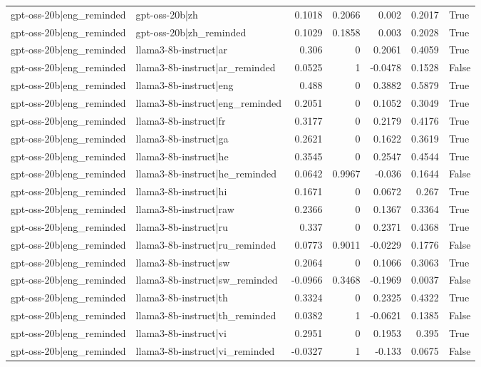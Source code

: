 \begin{table}
\begin{tabular}{l l r r r r l}
gpt-oss-20b|eng_reminded & gpt-oss-20b|zh & 0.1018 & 0.2066 & 0.002 & 0.2017 & True \\
gpt-oss-20b|eng_reminded & gpt-oss-20b|zh_reminded & 0.1029 & 0.1858 & 0.003 & 0.2028 & True \\
gpt-oss-20b|eng_reminded & llama3-8b-instruct|ar & 0.306 & 0 & 0.2061 & 0.4059 & True \\
gpt-oss-20b|eng_reminded & llama3-8b-instruct|ar_reminded & 0.0525 & 1 & -0.0478 & 0.1528 & False \\
gpt-oss-20b|eng_reminded & llama3-8b-instruct|eng & 0.488 & 0 & 0.3882 & 0.5879 & True \\
gpt-oss-20b|eng_reminded & llama3-8b-instruct|eng_reminded & 0.2051 & 0 & 0.1052 & 0.3049 & True \\
gpt-oss-20b|eng_reminded & llama3-8b-instruct|fr & 0.3177 & 0 & 0.2179 & 0.4176 & True \\
gpt-oss-20b|eng_reminded & llama3-8b-instruct|ga & 0.2621 & 0 & 0.1622 & 0.3619 & True \\
gpt-oss-20b|eng_reminded & llama3-8b-instruct|he & 0.3545 & 0 & 0.2547 & 0.4544 & True \\
gpt-oss-20b|eng_reminded & llama3-8b-instruct|he_reminded & 0.0642 & 0.9967 & -0.036 & 0.1644 & False \\
gpt-oss-20b|eng_reminded & llama3-8b-instruct|hi & 0.1671 & 0 & 0.0672 & 0.267 & True \\
gpt-oss-20b|eng_reminded & llama3-8b-instruct|raw & 0.2366 & 0 & 0.1367 & 0.3364 & True \\
gpt-oss-20b|eng_reminded & llama3-8b-instruct|ru & 0.337 & 0 & 0.2371 & 0.4368 & True \\
gpt-oss-20b|eng_reminded & llama3-8b-instruct|ru_reminded & 0.0773 & 0.9011 & -0.0229 & 0.1776 & False \\
gpt-oss-20b|eng_reminded & llama3-8b-instruct|sw & 0.2064 & 0 & 0.1066 & 0.3063 & True \\
gpt-oss-20b|eng_reminded & llama3-8b-instruct|sw_reminded & -0.0966 & 0.3468 & -0.1969 & 0.0037 & False \\
gpt-oss-20b|eng_reminded & llama3-8b-instruct|th & 0.3324 & 0 & 0.2325 & 0.4322 & True \\
gpt-oss-20b|eng_reminded & llama3-8b-instruct|th_reminded & 0.0382 & 1 & -0.0621 & 0.1385 & False \\
gpt-oss-20b|eng_reminded & llama3-8b-instruct|vi & 0.2951 & 0 & 0.1953 & 0.395 & True \\
gpt-oss-20b|eng_reminded & llama3-8b-instruct|vi_reminded & -0.0327 & 1 & -0.133 & 0.0675 & False \\

\end{tabular}
\end{table}
